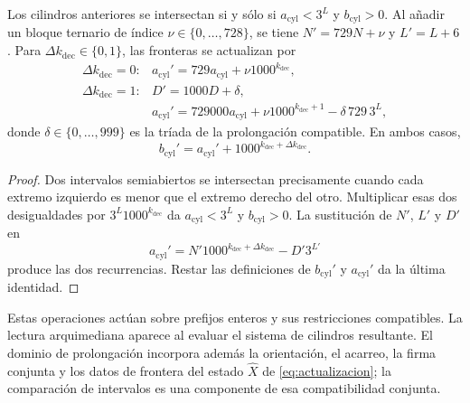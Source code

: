 \begin{lemma}
\label{memprof:cilindros}
Los cilindros anteriores se intersectan si y sólo si
\(a_{\mathrm{cyl}}<3^L\) y \(b_{\mathrm{cyl}}>0\).
Al añadir un bloque ternario de índice
\(\nu\in\{0,\ldots,728\}\), se tiene \(N'=729N+\nu\) y
\(L'=L+6\). Para \(\Delta k_{\mathrm{dec}}\in\{0,1\}\),
las fronteras se actualizan por
\[
 \begin{array}{ll}
 \Delta k_{\mathrm{dec}}=0:
   &a_{\mathrm{cyl}}'=729a_{\mathrm{cyl}}+\nu1000^{k_{\mathrm{dec}}},\\[2pt]
 \Delta k_{\mathrm{dec}}=1:
   &D'=1000D+\delta,\\
   &a_{\mathrm{cyl}}'=729000a_{\mathrm{cyl}}
      +\nu1000^{k_{\mathrm{dec}}+1}-\delta\,729\,3^L ,
 \end{array}
\]
donde \(\delta\in\{0,\ldots,999\}\) es la tríada de la prolongación
compatible. En ambos casos,
\[
 b_{\mathrm{cyl}}'=a_{\mathrm{cyl}}'
          +1000^{k_{\mathrm{dec}}+\Delta k_{\mathrm{dec}}}.
\]
\end{lemma}
\begin{proof}
Dos intervalos semiabiertos se intersectan precisamente cuando cada extremo
izquierdo es menor que el extremo derecho del otro. Multiplicar esas dos
desigualdades por \(3^L1000^{k_{\mathrm{dec}}}\) da
\(a_{\mathrm{cyl}}<3^L\) y \(b_{\mathrm{cyl}}>0\).
La sustitución de \(N'\), \(L'\) y \(D'\) en
\[
 a_{\mathrm{cyl}}'
 =N'1000^{k_{\mathrm{dec}}+\Delta k_{\mathrm{dec}}}-D'3^{L'}
\]
produce las dos recurrencias. Restar las definiciones de
\(b_{\mathrm{cyl}}'\) y \(a_{\mathrm{cyl}}'\) da la última identidad.
\end{proof}

Estas operaciones actúan sobre prefijos enteros y sus restricciones
compatibles. La lectura arquimediana aparece al evaluar el sistema de
cilindros resultante. El dominio de prolongación incorpora además la
orientación, el acarreo, la firma conjunta y los datos de frontera del estado
\(\widehat X\) de \eqref{eq:actualizacion}; la comparación de intervalos
es una componente de esa compatibilidad conjunta.
